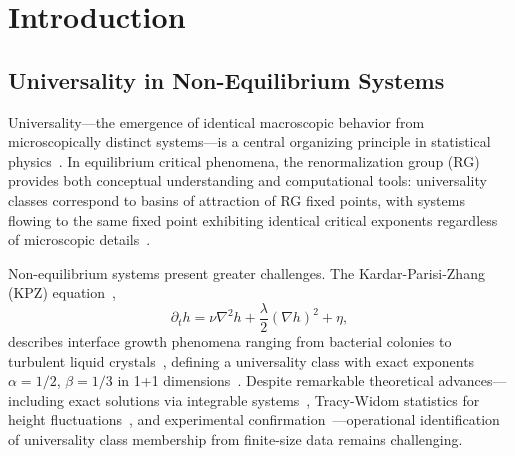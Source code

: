 \documentclass[aps,pre,reprint,amsmath,amssymb,superscriptaddress]{revtex4-2}
\begin{document}

\maketitle

\section{Introduction}
\label{sec:intro}

\subsection{Universality in Non-Equilibrium Systems}

Universality---the emergence of identical macroscopic behavior from microscopically distinct systems---is a central organizing principle in statistical physics~\cite{Kadanoff1966,Wilson1975}. In equilibrium critical phenomena, the renormalization group (RG) provides both conceptual understanding and computational tools: universality classes correspond to basins of attraction of RG fixed points, with systems flowing to the same fixed point exhibiting identical critical exponents regardless of microscopic details~\cite{Cardy1996,Goldenfeld1992}.

Non-equilibrium systems present greater challenges. The Kardar-Parisi-Zhang (KPZ) equation~\cite{KPZ1986},
\begin{equation}
\partial_t h = \nu \nabla^2 h + \frac{\lambda}{2}(\nabla h)^2 + \eta,
\label{eq:KPZ}
\end{equation}
describes interface growth phenomena ranging from bacterial colonies to turbulent liquid crystals~\cite{Barabasi1995,HalpinHealy1995}, defining a universality class with exact exponents $\alpha = 1/2$, $\beta = 1/3$ in 1+1 dimensions~\cite{Prahofer2004}. Despite remarkable theoretical advances---including exact solutions via integrable systems~\cite{Sasamoto2010,Corwin2012}, Tracy-Widom statistics for height fluctuations~\cite{Johansson2000,TracyWidom1994}, and experimental confirmation~\cite{Takeuchi2010}---operational identification of universality class membership from finite-size data remains challenging.
\end{document}
